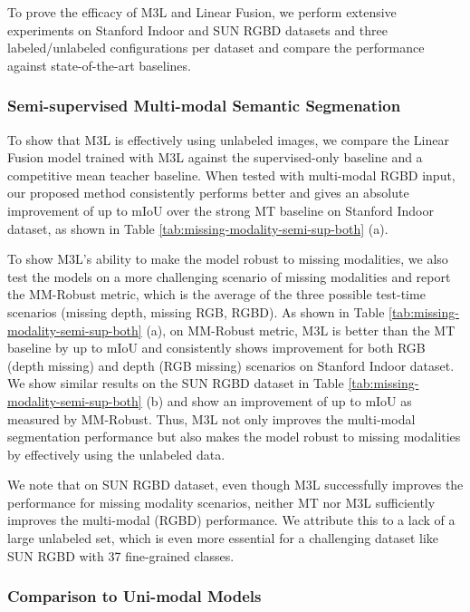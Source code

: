 \documentclass[10pt,twocolumn,letterpaper]{article}
\begin{document}
To prove the efficacy of M3L and Linear Fusion, we perform extensive experiments on Stanford Indoor and SUN RGBD datasets and three labeled/unlabeled configurations per dataset and compare the performance against state-of-the-art baselines. \vspace{-0.5cm}
\subsubsection{Semi-supervised Multi-modal Semantic Segmenation}
\label{sec:results-missing-mod-semi-sup}

To show that M3L is effectively using unlabeled images, we compare the Linear Fusion model trained with M3L against the supervised-only baseline and a competitive mean teacher \cite{mt} baseline. When tested with multi-modal RGBD input, our proposed method consistently performs better and gives an absolute improvement of up to  mIoU over the strong MT \cite{mt} baseline on Stanford Indoor \cite{stanfordindoor} dataset, as shown in Table \ref{tab:missing-modality-semi-sup-both} (a).



To show M3L’s ability to make the model robust to missing modalities, we also test the models on a more challenging scenario of missing modalities and report the MM-Robust metric, which is the average of the three possible test-time scenarios (missing depth, missing RGB, RGBD). As shown in Table \ref{tab:missing-modality-semi-sup-both} (a), on MM-Robust metric, M3L is better than the MT baseline by up to  mIoU and consistently shows improvement for both RGB (depth missing) and depth (RGB missing) scenarios on Stanford Indoor dataset. We show similar results on the SUN RGBD dataset in Table \ref{tab:missing-modality-semi-sup-both} (b) and show an improvement of up to  mIoU as measured by MM-Robust. Thus, M3L not only improves the multi-modal segmentation performance but also makes the model robust to missing modalities by effectively using the unlabeled data.

We note that on SUN RGBD dataset, even though M3L successfully improves the performance for missing modality scenarios, neither MT \cite{mt} nor M3L sufficiently improves the multi-modal (RGBD) performance. We attribute this to a lack of a large unlabeled set, which is even more essential for a challenging dataset like SUN RGBD with 37 fine-grained classes. 

\subsubsection{Comparison to Uni-modal Models}
\end{document}
